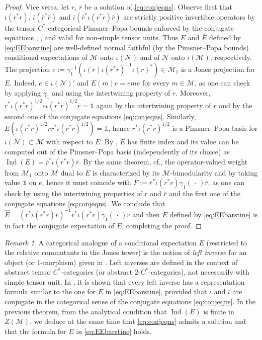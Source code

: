 \documentclass[11pt,a4paper]{article}
\makeatletter
\newcommand{\oneop}{\mathds{1}}
\newcommand{\rbar}{{\overline{r}}}
\newcommand{\iotabar}{{\overline{\iota}}}
\newcommand{\Ehat}{{\widehat{E}}}
\newcommand{\Ebar}{{\overline{E}}}
\newcommand{\slot}{{\,\cdot \,}}
\newcommand{\M}{\mathcal{M}}
\newcommand{\N}{\mathcal{N}}
\DeclareMathOperator{\Ind}{Ind}
\DeclareRobustCommand{\cf}{cf.\@\xspace}
\DeclareRobustCommand{\Sec}{Sec.\@\xspace}
\DeclareRobustCommand{\Lem}{Lem.\@\xspace}
\DeclareRobustCommand{\Thm}{Thm.\@\xspace}
\DeclareRobustCommand{\Rmk}{Rmk.\@\xspace}
\newcommand{\Cstar}{$C^\ast$\@\xspace}
\theoremstyle{plain}
\theoremstyle{definition}
\theoremstyle{remark}
\newtheorem{rmk}[thm]{Remark}
\numberwithin{equation}{section}%
\makeatother
\begin{document}
\begin{proof}
Vice versa, let $r$, $\rbar$ be a solution of \eqref{eq:conjeqns}. Observe first that $\iota(r^*r)$, $\iotabar(\rbar^*\rbar)$ and $\iotabar(\rbar^* \iota(r^*r)\rbar)$ are strictly positive invertible operators by the tensor \Cstar-categorical Pimsner--Popa bounds enforced by the conjugate equations \cite[\Lem 2.7]{LoRo97}, \cite[\Lem 8.18]{GiLo19}, and valid for non-simple tensor units. Thus $E$ and $\Ebar$ defined by \eqref{eq:EEbarstine} are well-defined normal faithful (by the Pimsner--Popa bounds) conditional expectations of $\M$ onto $\iota(\N)$ and of $\N$ onto $\iotabar(\M)$, respectively. The projection $e := \gamma_1^{-1}(\iota(r)\iota(r^*r)^{-1}\iota(r)^*)\in\M_1$ is a Jones projection for $E$. Indeed, $e\in\iota(\N)'$ and $E(m) e = e m e$ for every $m\in\M$, as one can check by applying $\gamma_1$ and using the intertwining property of $r$. Moreover, $\rbar^* \iota(r^*r)^{1/2} e \iota(r^*r)^{1/2} \rbar = \oneop$ again by the intertwining property of $r$ and by the second one of the conjugate equations \eqref{eq:conjeqns}. Similarly, $E(\iota(r^*r)^{1/2} \rbar\rbar^* \iota(r^*r)^{1/2}) = \oneop$, hence $\rbar^* \iota(r^*r)^{1/2}$ is a Pimsner--Popa basis for $\iota(\N)\subset\M$ with respect to $E$. By \cite[\Thm 3.5]{BDH88}, $E$ has finite index and its value can be computed out of the Pimsner--Popa basis (independently of its choice) as $\Ind(E) = \rbar^* \iota(r^*r) \rbar$. 
By the same theorem, \cf \cite[\Rmk 3.8]{BDH88}, the operator-valued weight from $\M_1$ onto $\M$ dual to $E$ is characterized by its $\M$-bimodularity and by taking value $\oneop$ on $e$, hence it must coincide with $F := \rbar^* \iota(r^*r) \gamma_1(\slot) \rbar$, as one can check by using the intertwining properties of $r$ and $\rbar$ and the first one of the conjugate equations \eqref{eq:conjeqns}.
We conclude that $\Ehat = (\rbar^* \iota(r^*r) \rbar)^{-1} \rbar^* \iota(r^*r) \gamma_1(\slot) \rbar$ and then $\Ebar$ defined by \eqref{eq:EEbarstine} is in fact the conjugate expectation of $E$, completing the proof.
\end{proof}

\begin{rmk}
A categorical analogue of a conditional expectation $E$ (restricted to the relative commutants in the Jones tower) is the notion of \emph{left inverse} for an object (or 1-morphism) given in \cite[\Sec 2]{LoRo97}. Left inverses are defined in the context of abstract tensor \Cstar-categories (or abstract 2-\Cstar-categories), not necessarily with simple tensor unit. In \cite[\Lem 2.5]{LoRo97}, it is shown that every left inverse has a representation formula similar to the one for $E$ in \eqref{eq:EEbarstine}, provided that $\iota$ and $\iotabar$ are conjugate in the categorical sense of the conjugate equations \eqref{eq:conjeqns}. In the previous theorem, from the analytical condition that $\Ind(E)$ is finite in $Z(\M)$, we deduce at the same time that \eqref{eq:conjeqns} admits a solution and that the formula for $E$ in \eqref{eq:EEbarstine} holds.
\end{rmk}
\end{document}
